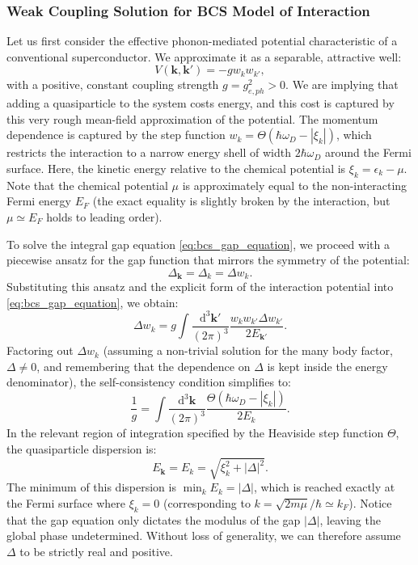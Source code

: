\subsubsection{Weak Coupling Solution for BCS Model of Interaction}

Let us first consider the effective phonon-mediated potential characteristic of a conventional superconductor. We approximate it as a separable, attractive well:
\[
    V(\mathbf{k}, \mathbf{k}') = -g w_k w_{k'},
\]
with a positive, constant coupling strength \( g = g_{e,ph}^2 > 0 \). We are implying that adding a quasiparticle to the system costs energy, and this cost is captured by this very rough mean-field approximation of the potential. The momentum dependence is captured by the step function \( w_k = \Theta(\hbar\omega_D - |\xi_k|) \), which restricts the interaction to a narrow energy shell of width \( 2\hbar\omega_D \) around the Fermi surface. Here, the kinetic energy relative to the chemical potential is \( \xi_k = \epsilon_k - \mu \). Note that the chemical potential \( \mu \) is approximately equal to the non-interacting Fermi energy \( E_F \) (the exact equality is slightly broken by the interaction, but \( \mu \simeq E_F \) holds to leading order).

To solve the integral gap equation \eqref{eq:bcs_gap_equation}, we proceed with a piecewise ansatz for the gap function that mirrors the symmetry of the potential:
\[
    \Delta_{\mathbf{k}} = \Delta_k = \Delta w_k.
\]
Substituting this ansatz and the explicit form of the interaction potential into \eqref{eq:bcs_gap_equation}, we obtain:
\[
    \Delta w_k = g \int \frac{\mathrm{d}^3\mathbf{k}'}{(2\pi)^3} \frac{w_k w_{k'} \Delta w_{k'}}{2E_{\mathbf{k}'}}.
\]
Factoring out \( \Delta w_k \) (assuming a non-trivial solution for the many body factor, \( \Delta \neq 0 \), and remembering that the dependence on \(\Delta\) is kept inside the energy denominator), the self-consistency condition simplifies to:
\[
    \frac{1}{g} = \int \frac{\mathrm{d}^3\mathbf{k}}{(2\pi)^3} \frac{\Theta(\hbar\omega_D - |\xi_k|)}{2E_k}.
\]
In the relevant region of integration specified by the Heaviside step function \( \Theta \), the quasiparticle dispersion is:
\[
    E_{\mathbf{k}} = E_k = \sqrt{\xi_k^2 + |\Delta|^2}.
\]
The minimum of this dispersion is \( \min_k E_k = |\Delta| \), which is reached exactly at the Fermi surface where \( \xi_k = 0 \) (corresponding to \( k = \sqrt{2m\mu}/\hbar \simeq k_F \)). Notice that the gap equation only dictates the modulus of the gap \( |\Delta| \), leaving the global phase undetermined. Without loss of generality, we can therefore assume \( \Delta \) to be strictly real and positive.


